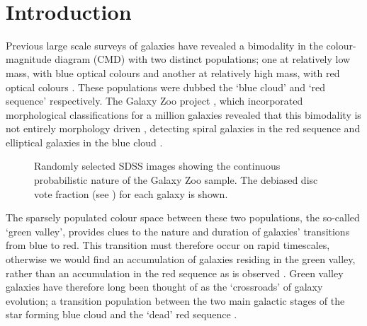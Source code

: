 \documentclass[useAMS,usenatbib]{mn2e}
\def\changed    {\color{titlecol} }
\begin{document}
\\

\section{Introduction}
Previous large scale surveys of galaxies have revealed a bimodality in the colour-magnitude diagram (CMD) with two distinct populations; one at relatively low mass, with blue optical colours and another at relatively high mass, with red optical colours \citep{Baldry04, Baldry06, Willmer06, BLB08, Brammer09}. These populations were dubbed the `blue cloud' and `red sequence' respectively. The Galaxy Zoo project \citep{Lintott11}, which incorporated morphological classifications for a million galaxies revealed that this bimodality is not entirely morphology driven \citep{Bamford09, Skibba09}, detecting spiral galaxies in the red sequence \citep{Masters10} and elliptical galaxies in the blue cloud \citep{Sch09}.  

\begin{figure}
\caption{{\changed Randomly selected SDSS images showing the continuous probabilistic nature of the Galaxy Zoo sample. The debiased disc vote fraction (see \citealt{GZ2}) for each galaxy is shown.}}
\label{mosaic}
\end{figure}

The sparsely populated colour space between these two populations, the so-called `green valley', provides clues to the nature and duration of galaxies' transitions from blue to red. This transition must therefore occur on rapid timescales, otherwise we would find an accumulation of galaxies residing in the green valley, rather than an accumulation in the red sequence as is observed \citep{Arnouts07, Martin07}. Green valley galaxies have therefore long been thought of as the `crossroads' of galaxy evolution; a transition population between the two main galactic stages of the star forming blue cloud and the `dead' red sequence \citep{Bell04, Wyder07, Schim07, Martin07, Faber07, Mendez11, Gonc12, Sch2014}. 
\end{document}
